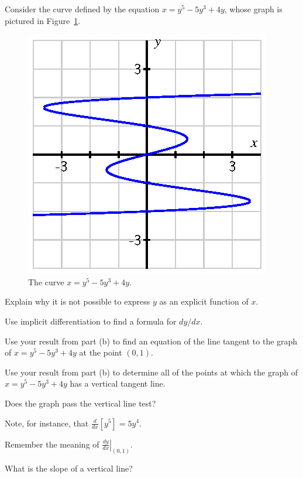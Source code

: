 \begin{activity} \label{A:2.7.1}  
Consider the curve defined by the equation $x = y^5 - 5y^3 + 4y$, whose graph is pictured in Figure~\ref{F:2.7.Act1}.
\begin{figure}[h]
\begin{center}
\includegraphics{figures/2_7_Act1.eps}
\caption{The curve $x = y^5 - 5y^3 + 4y$.} \label{F:2.7.Act1}
\end{center}
\end{figure}
\ba
	\item Explain why it is not possible to express $y$ as an explicit function of $x$.

	\item Use implicit differentiation to find a formula for $dy/dx$.

	\item Use your result from part (b) to find an equation of the line tangent to the graph of $x = y^5 -
5y^3 + 4y$ at the point $(0, 1)$.

	\item Use your result from part (b) to determine all of the points at
which the graph of $x = y^5 - 5y^3 + 4y$ has a vertical tangent
line.
\ea
\end{activity}
\begin{smallhint}
\ba
	\item Does the graph pass the vertical line test?
	\item Note, for instance, that $\frac{d}{dx}[y^5] = 5y^4$.
	\item Remember the meaning of $\left. \frac{dy}{dx} \right|_{(0,1)}$.
	\item What is the slope of a vertical line?
\ea
\end{smallhint}
